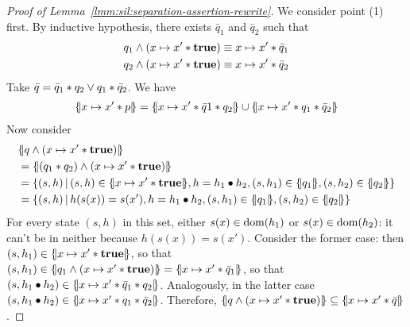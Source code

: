 \begin{proof}[Proof of Lemma~\ref{lmm:sil:separation-assertion-rewrite}]
	We consider point (1) first. By inductive hypothesis, there exists $\bar{q}_1$ and $\bar{q}_2$ such that
	\begin{align*}
		q_1 \land (x \mapsto x' * \textbf{true}) & \equiv x \mapsto x' * \bar{q}_1 \\
		q_2 \land (x \mapsto x' * \textbf{true}) & \equiv x \mapsto x' * \bar{q}_2
	\end{align*}
	Take $\bar{q} = \bar{q}_1 * q_2 \lor q_1 * \bar{q}_2$. We have
	\begin{align*}
		\{\hspace{-2pt}|x \mapsto x' * p|\hspace{-2pt}\} = \{\hspace{-2pt}|x \mapsto x' * \bar{q}1 * q_2|\hspace{-2pt}\} \cup \{\hspace{-2pt}|x \mapsto x' * q_1 * \bar{q}_2|\hspace{-2pt}\}
	\end{align*}
	Now consider
	\begin{align*}
		 & \asldenot{q \land (x \mapsto x' \andsep \true)}                                                                                                                \\
		 & =\asldenot{(q_1 \andsep q_2) \land (x \mapsto x' \andsep \true)}                                                                                               \\
		 & =\lbrace (s, h) \svert (s, h) \in \asldenot{x \mapsto x' \andsep \true}, h = h_1 \bullet h_2, (s, h_1) \in \asldenot{q_1}, (s, h_2) \in \asldenot{q_2} \rbrace \\
		 & =\lbrace (s, h) \svert h(s(x)) = s(x'), h = h_1 \bullet h_2, (s, h_1) \in \asldenot{q_1}, (s, h_2) \in \asldenot{q_2} \rbrace
	\end{align*}
	For every state $(s, h)$ in this set, either $s(x) \in \text{dom}(h_1)$ or $s(x) \in \text{dom}(h_2)$: it can't be in neither because $h(s(x)) = s(x')$. Consider the former case: then $(s, h_1) \in \{\hspace{-2pt}|x \mapsto x' * \textbf{true}|\hspace{-2pt}\}$, so that $(s, h_1) \in \{\hspace{-2pt}|q_1 \land (x \mapsto x' * \textbf{true})|\hspace{-2pt}\} = \{\hspace{-2pt}|x \mapsto x' * \bar{q}_1|\hspace{-2pt}\}$, so that $(s, h_1 \bullet h_2) \in \{\hspace{-2pt}|x \mapsto x' * \bar{q}_1 * q_2|\hspace{-2pt}\}$. Analogously, in the latter case $(s, h_1 \bullet h_2) \in \{\hspace{-2pt}|x \mapsto x' * q_1 * \bar{q}_2|\hspace{-2pt}\}$.
	Therefore, $\{\hspace{-2pt}|q \land (x \mapsto x' * \textbf{true})|\hspace{-2pt}\} \subseteq \{\hspace{-2pt}|x \mapsto x' * \bar{q}|\hspace{-2pt}\}$.


\end{proof}
